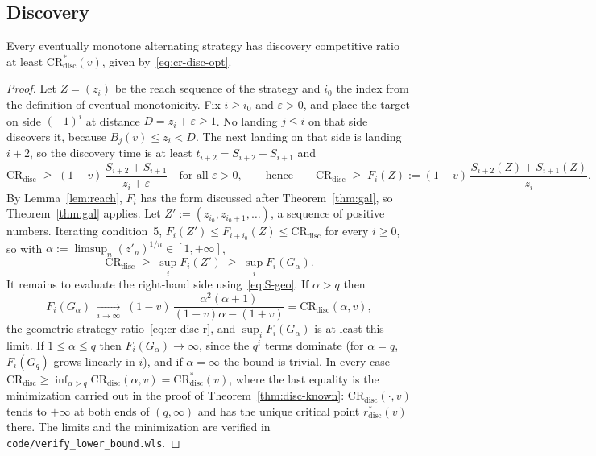 \documentclass[runningheads,envcountsame,envcountsect]{llncs}
\newcommand{\CR}{\mathrm{CR}}
\newcommand{\disc}{\mathrm{disc}}
\begin{document}
\subsection{Discovery}

\begin{theorem}\label{thm:lb-disc}
Every eventually monotone alternating strategy has discovery competitive ratio at least $\CR^{*}_{\disc}(v)$, given by~\eqref{eq:cr-disc-opt}.
\end{theorem}
\begin{proof}
Let $Z = (z_i)$ be the reach sequence of the strategy and $i_0$ the index from the definition of eventual monotonicity. Fix $i \geq i_0$ and $\varepsilon > 0$, and place the target on side $(-1)^i$ at distance $D = z_i + \varepsilon \geq 1$. No landing $j \leq i$ on that side discovers it, because $B_j(v) \leq z_i < D$. The next landing on that side is landing $i+2$, so the discovery time is at least $t_{i+2} = S_{i+2} + S_{i+1}$ and
\[
  \CR_{\disc} \;\geq\; (1-v)\,\frac{S_{i+2} + S_{i+1}}{z_i + \varepsilon} \quad\text{for all } \varepsilon > 0,
  \qquad\text{hence}\qquad
  \CR_{\disc} \;\geq\; F_i(Z) := (1-v)\,\frac{S_{i+2}(Z) + S_{i+1}(Z)}{z_i} .
\]
By Lemma~\ref{lem:reach}, $F_i$ has the form discussed after Theorem~\ref{thm:gal}, so Theorem~\ref{thm:gal} applies. Let $Z' := (z_{i_0}, z_{i_0+1}, \ldots)$, a sequence of positive numbers. Iterating condition~5, $F_i(Z') \leq F_{i + i_0}(Z) \leq \CR_{\disc}$ for every $i \geq 0$, so with $\alpha := \limsup_n (z'_n)^{1/n} \in [1, +\infty]$,
\[
  \CR_{\disc} \;\geq\; \sup_{i} F_i(Z') \;\geq\; \sup_i F_i(G_\alpha) .
\]
It remains to evaluate the right-hand side using~\eqref{eq:S-geo}. If $\alpha > q$ then
\[
  F_i(G_\alpha) \;\xrightarrow[i \to \infty]{}\; (1-v)\,\frac{\alpha^2 (\alpha + 1)}{(1-v)\alpha - (1+v)} = \CR_{\disc}(\alpha, v),
\]
the geometric-strategy ratio~\eqref{eq:cr-disc-r}, and $\sup_i F_i(G_\alpha)$ is at least this limit. If $1 \leq \alpha \leq q$ then $F_i(G_\alpha) \to \infty$, since the $q^{i}$ terms dominate (for $\alpha = q$, $F_i(G_q)$ grows linearly in $i$), and if $\alpha = \infty$ the bound is trivial. In every case $\CR_{\disc} \geq \inf_{\alpha > q} \CR_{\disc}(\alpha, v) = \CR^{*}_{\disc}(v)$, where the last equality is the minimization carried out in the proof of Theorem~\ref{thm:disc-known}: $\CR_{\disc}(\cdot, v)$ tends to $+\infty$ at both ends of $(q, \infty)$ and has the unique critical point $r^{*}_{\disc}(v)$ there. The limits and the minimization are verified in \texttt{code/verify\_lower\_bound.wls}.
\end{proof}
\end{document}

